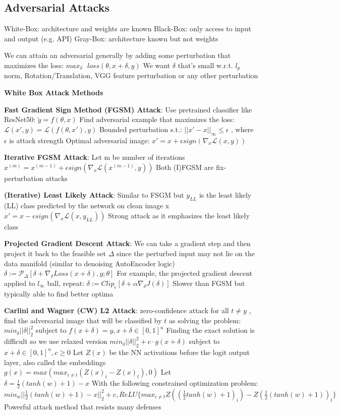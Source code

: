 \subsection*{Adversarial Attacks}
White-Box: architecture and weights are known
Black-Box: only access to input and output (e.g. API)
Gray-Box: architecture known but not weights

We can attain an adversarial generally by adding some perturbation that maximizes the loss: 
$max_{\delta} \text{ } loss(\theta, x + \delta, y) $
We want $\delta$ that's small w.r.t.
$l_p$ norm,
Rotation/Translation,
VGG feature perturbation or any other perturbation

\textbf{White Box Attack Methods}

\textbf{Fast Gradient Sign Method (FGSM) Attack}: 
Use pretrained classifier like ResNet50: $\tilde y = f(\theta, x)$
Find adversarial example that maximizes the loss: $\mathcal{L} (x', y) = \mathcal{L}(f(\theta, x'), y)$ 
Bounded perturbation s.t.: $||x'-x||_{\infty}\leq \epsilon$ , where $\epsilon$ is attack strength
Optimal adversarial image: $x' = x + \epsilon sign(\nabla_{x}\mathcal{L}(x, y))$ 

\textbf{Iterative FGSM Attack}: 
Let m be number of iterations 
$x^{(m)} = x^{(m-1)} + \epsilon sign(\nabla_{x}\mathcal{L}(x^{(m-1)}, y))$ 
Both (I)FGSM are fix-perturbation attacks

\textbf{(Iterative) Least Likely Attack}: 
Similar to FSGM but $y_{LL}$ is the least likely (LL) class predicted by the network on clean image x
$x' = x - \epsilon sign(\nabla_{x}\mathcal{L}(x, y_{LL}))$
Strong attack as it emphasizes the least likely class

\textbf{Projected Gradient Descent Attack}: 
We can take a gradient step and then project it back to the feasible set $\Delta$ since the perturbed input may not lie on the data manifold (similar to denoising AutoEncoder logic)
$\delta := \mathcal{P}_{\Delta}[\delta + \nabla_{\delta}Loss(x + \delta), y; \theta]$ 
For example, the projected gradient descent applied to $l_\infty$ ball, repeat: 
$\delta := Clip_{\epsilon}[\delta + \alpha \nabla_{\delta}J(\delta)]$ 
Slower than FGSM but typically able to find better optima 

\textbf{Carlini and Wagner (CW) L2 Attack}: 
zero-confidence attack 
for all $t \neq y$ , find the adversarial image that will be classified by $t$ as solving the problem: $min_{\delta}||\delta||_{2}^{2}$ subject to $f(x + \delta) = y, x + \delta \in [0, 1]^{n}$
Finding the exact solution is difficult so we use relaxed version
$min_{\delta}||\delta||_{2}^{2} + c \cdot g(x + \delta)$  subject to $x + \delta \in [0, 1]^{n}, c \geq 0$ 
Let $Z(x)$ be the NN activations before the logit output layer, also called the embeddings
$g(x) = max\left(max_{i\neq t} (Z(x)_{i} - Z(x)_{t}), 0\right)$
Let $\delta = \frac{1}{2}(tanh(w) + 1) - x$
With the following constrained optimization problem: 
$
min_w||\frac{1}{2}(tanh(w)+1)-x||_{2}^{2} + c,
ReLU\{max_{i\neq t}Z\left(\left(\frac{1}{2}tanh(w) + 1\right)_{i}\right)- Z\left(\frac{1}{2}\left(tanh(w) + 1\right)\right)_{t}\}
$
Powerful attack method that resists many defenses

